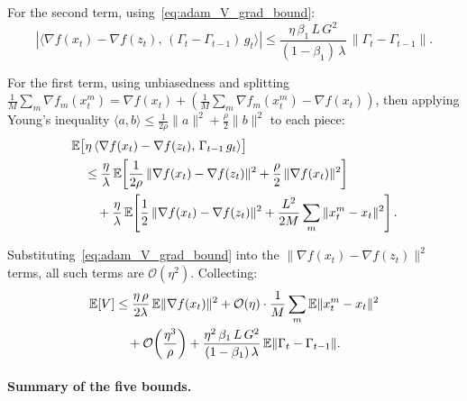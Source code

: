 \documentclass{article}
\begin{document}
For the second term, using~\eqref{eq:adam_V_grad_bound}:
\begin{equation}
|\langle \nabla f(x_t) - \nabla f(z_t),\,
(\Gamma_t - \Gamma_{t-1})\,g_t \rangle|
\leq \frac{\eta\,\beta_1\,L\,G^2}{(1-\beta_1)\,\lambda}\,
\|\Gamma_t - \Gamma_{t-1}\|.
\label{eq:adam_V_perturb}
\end{equation}

For the first term, using unbiasedness and splitting
$\frac{1}{M}\sum_m \nabla f_m(x_t^m) = \nabla f(x_t) +
(\frac{1}{M}\sum_m \nabla f_m(x_t^m) - \nabla f(x_t))$, then applying
Young's inequality $\langle a,b \rangle \leq \frac{1}{2\rho}\|a\|^2 +
\frac{\rho}{2}\|b\|^2$ to each piece:
\begin{align}
&\mathbb{E}\bigl[\eta\,\langle \nabla f(x_t) - \nabla f(z_t),\,
\Gamma_{t-1}\,g_t \rangle\bigr] \notag \\
&\quad\leq \frac{\eta}{\lambda}\,\mathbb{E}\!\left[
\frac{1}{2\rho}\,\|\nabla f(x_t) - \nabla f(z_t)\|^2
+ \frac{\rho}{2}\,\|\nabla f(x_t)\|^2\right] \notag \\
&\qquad+ \frac{\eta}{\lambda}\,\mathbb{E}\!\left[
\frac{1}{2}\,\|\nabla f(x_t) - \nabla f(z_t)\|^2
+ \frac{L^2}{2M}\sum_m \|x_t^m - x_t\|^2\right].
\label{eq:adam_V_young}
\end{align}

Substituting~\eqref{eq:adam_V_grad_bound} into the
$\|\nabla f(x_t) - \nabla f(z_t)\|^2$ terms, all such terms are
$\mathcal{O}(\eta^2)$. Collecting:
\begin{align}
\mathbb{E}[V]
&\leq \frac{\eta\,\rho}{2\lambda}\,\mathbb{E}\|\nabla f(x_t)\|^2
  + \mathcal{O}(\eta)\cdot\frac{1}{M}\sum_m\mathbb{E}\|x_t^m - x_t\|^2
  \notag \\
&\quad+ \mathcal{O}\!\left(\frac{\eta^3}{\rho}\right)
  + \frac{\eta^2\,\beta_1\,L\,G^2}{(1-\beta_1)\,\lambda}\,
  \mathbb{E}\|\Gamma_t - \Gamma_{t-1}\|.
\label{eq:adam_V_final}
\end{align}

\paragraph{Summary of the five bounds.}
\end{document}
